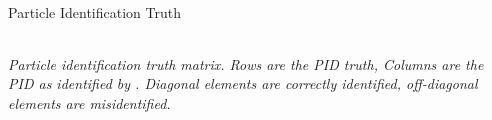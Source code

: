 \begin{frame}{Particle Identification Truth}
\begin{center}
\begin{tabularx}{230pt}{Xllllll}
        \end{tabularx}
    \end{center}
    \scriptsize{\textit{
        Particle identification truth matrix.
        Rows are the PID truth, Columns are the PID as identified by .
        Diagonal elements are correctly identified, off-diagonal elements are misidentified.
    }}
\end{frame}
